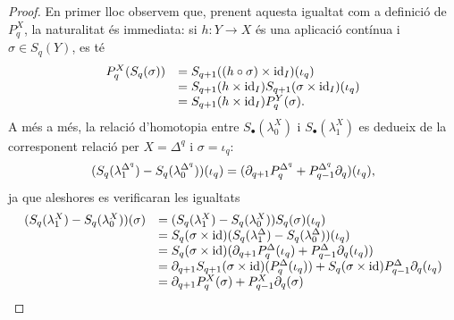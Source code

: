 \documentclass[../main.tex]{subfiles}
\begin{document}
\begin{proof}
En primer lloc observem que, prenent aquesta igualtat com a definició de $P_q^X$, la naturalitat és immediata: si $h:Y\rightarrow X$ és una aplicació contínua i $\sigma\in S_q(Y)$, es té
\begin{equation}
    \notag
    \begin{array}{ll}
        P_q^X(S_q(\sigma)) & = S_{q+1}((h\circ\sigma)\times \mathrm{id}_I)(\iota_q) \\
         & = S_{q+1}(h\times\mathrm{id}_I)S_{q+1}(\sigma\times \mathrm{id}_I)(\iota_q) \\
         &= S_{q+1}(h\times\mathrm{id}_I)P_q^Y(\sigma).
    \end{array}
\end{equation}
A més a més, la relació d'homotopia entre $S_\bullet(\lambda_0^X)$ i $S_\bullet(\lambda_1^X)$ es dedueix de la corresponent relació per $X = \Delta^q$ i $\sigma = \iota_q$:
\begin{equation}
    \notag
    (S_q(\lambda_1^{\Delta^q})-S_q(\lambda_0^{\Delta^q}))(\iota_q) = (\partial_{q+1}P_q^{\Delta^q}+P_{q-1}^{\Delta^q}\partial_q)(\iota_q),
\end{equation}
ja que aleshores es verificaran les igualtats
\begin{equation}
    \notag
    \begin{array}{ll}
        (S_q(\lambda_1^X)-S_q(\lambda_0^X))(\sigma) & = (S_q(\lambda_1^X)-S_q(\lambda_0^X))S_q(\sigma)(\iota_q) \\
         & = S_q(\sigma\times\mathrm{id})(S_q(\lambda_1^\Delta)-S_q(\lambda_0^\Delta))(\iota_q) \\
         & = S_q(\sigma\times\mathrm{id})(\partial_{q+1}P_q^\Delta(\iota_q)+P_{q-1}^\Delta\partial_q(\iota_q)) \\
         & = \partial_{q+1}S_{q+1}(\sigma\times\mathrm{id})(P_q^\Delta(\iota_q))+S_q(\sigma\times \mathrm{id})P_{q-1}^\Delta\partial_q(\iota_q)\\
         &= \partial_{q+1}P_q^X(\sigma)+P_{q-1}^X\partial_q(\sigma)
    \end{array}
\end{equation}


\end{proof}
\end{document}
